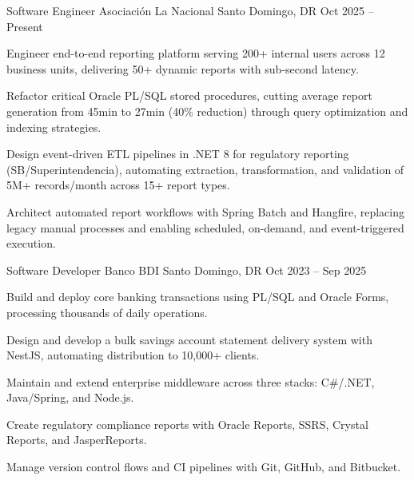 \documentclass[]{awesome-cv}
\begin{document}
\begin{cventries}
	\cventry
	{Software Engineer}
	{Asociaci\'{o}n La Nacional}
	{Santo Domingo, DR}
	{Oct 2025 -- Present}
	{\begin{cvitems}
		\item {Engineer end-to-end reporting platform serving 200+ internal users across 12 business units, delivering 50+ dynamic reports with sub-second latency.}
		\item {Refactor critical Oracle PL/SQL stored procedures, cutting average report generation from 45min to 27min (40\% reduction) through query optimization and indexing strategies.}
		\item {Design event-driven ETL pipelines in .NET 8 for regulatory reporting (SB/Superintendencia), automating extraction, transformation, and validation of 5M+ records/month across 15+ report types.}
		\item {Architect automated report workflows with Spring Batch and Hangfire, replacing legacy manual processes and enabling scheduled, on-demand, and event-triggered execution.}
		\end{cvitems}}

	\cventry
	{Software Developer}
	{Banco BDI}
	{Santo Domingo, DR}
	{Oct 2023 -- Sep 2025}
	{\begin{cvitems}
		\item {Build and deploy core banking transactions using PL/SQL and Oracle Forms, processing thousands of daily operations.}
		\item {Design and develop a bulk savings account statement delivery system with NestJS, automating distribution to 10,000+ clients.}
		\item {Maintain and extend enterprise middleware across three stacks: C\#/.NET, Java/Spring, and Node.js.}
		\item {Create regulatory compliance reports with Oracle Reports, SSRS, Crystal Reports, and JasperReports.}
		\item {Manage version control flows and CI pipelines with Git, GitHub, and Bitbucket.}
		\end{cvitems}}
\end{cventries}
\end{document}
